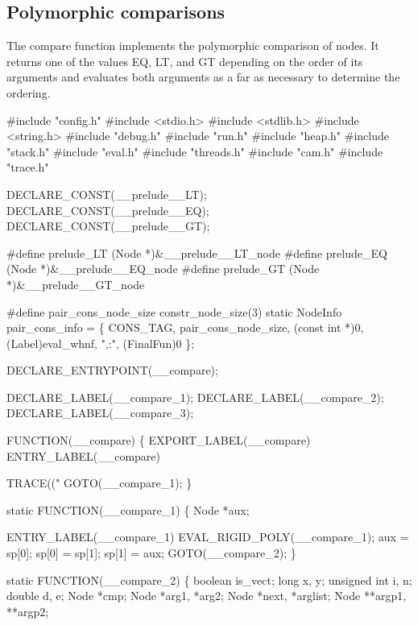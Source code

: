 %
%
\subsection{Polymorphic comparisons}
The {\Tt{}compare\nwendquote} function implements the polymorphic comparison of
nodes. It returns one of the values {\Tt{}EQ\nwendquote}, {\Tt{}LT\nwendquote}, and {\Tt{}GT\nwendquote}
depending on the order of its arguments and evaluates both
arguments as a far as necessary to determine the ordering.

\nwenddocs{}\endmoddef\nwstartdeflinemarkup\nwenddeflinemarkup
#include "config.h"
#include <stdio.h>
#include <stdlib.h>
#include <string.h>
#include "debug.h"
#include "run.h"
#include "heap.h"
#include "stack.h"
#include "eval.h"
#include "threads.h"
#include "cam.h"
#include "trace.h"

DECLARE_CONST(__prelude__LT);
DECLARE_CONST(__prelude__EQ);
DECLARE_CONST(__prelude__GT);

#define prelude_LT (Node *)&__prelude__LT_node
#define prelude_EQ (Node *)&__prelude__EQ_node
#define prelude_GT (Node *)&__prelude__GT_node

#define pair_cons_node_size constr_node_size(3)
static
NodeInfo pair_cons_info = \{
    CONS_TAG, pair_cons_node_size, (const int *)0, (Label)eval_whnf, ",:", (FinalFun)0
\};

DECLARE_ENTRYPOINT(__compare);

DECLARE_LABEL(__compare_1);
DECLARE_LABEL(__compare_2);
DECLARE_LABEL(__compare_3);

FUNCTION(__compare)
\{
    EXPORT_LABEL(__compare)
 ENTRY_LABEL(__compare)

    TRACE(("%
    GOTO(__compare_1);
\}

static
FUNCTION(__compare_1)
\{
    Node *aux;

 ENTRY_LABEL(__compare_1)
    EVAL_RIGID_POLY(__compare_1);
    aux   = sp[0];
    sp[0] = sp[1];
    sp[1] = aux;
    GOTO(__compare_2);
\}

static
FUNCTION(__compare_2)
\{
    boolean      is_vect;
    long         x, y;
    unsigned int i, n;
    double       d, e;
    Node         *cmp;
    Node         *arg1, *arg2;
    Node         *next, *arglist;
    Node         **argp1, **argp2;

